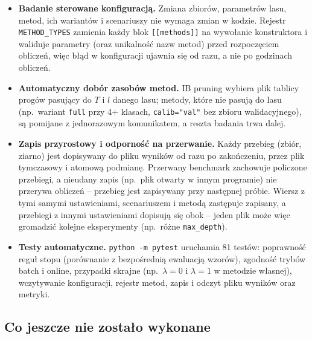 \documentclass{article}
\newcommand{\code}[1]{\texttt{#1}}
\begin{document}
\begin{itemize}[leftmargin=*]
  \item \textbf{Badanie sterowane konfiguracją.} Zmiana zbiorów, parametrów lasu, metod,
        ich wariantów i scenariuszy nie wymaga zmian w kodzie. Rejestr
        \code{METHOD\_TYPES} zamienia każdy blok \code{[[methods]]} na wywołanie
        konstruktora i waliduje parametry (oraz unikalność nazw metod) przed rozpoczęciem
        obliczeń, więc błąd w konfiguracji ujawnia się od razu, a nie po godzinach obliczeń.
  \item \textbf{Automatyczny dobór zasobów metod.} IB pruning wybiera plik tablicy progów
        pasujący do $T$ i $l$ danego lasu; metody, które nie pasują do lasu (np.\ wariant
        \code{full} przy 4+ klasach, \code{calib="val"} bez zbioru walidacyjnego), są
        pomijane z jednorazowym komunikatem, a reszta badania trwa dalej.
  \item \textbf{Zapis przyrostowy i odporność na przerwanie.} Każdy przebieg (zbiór,
        ziarno) jest dopisywany do pliku wyników od razu po zakończeniu, przez plik
        tymczasowy i atomową podmianę. Przerwany benchmark zachowuje policzone przebiegi,
        a nieudany zapis (np.\ plik otwarty w innym programie) nie przerywa obliczeń --
        przebieg jest zapisywany przy następnej próbie.
        Wiersz z tymi samymi ustawieniami, scenariuszem i metodą zastępuje zapisany, a
        przebiegi z innymi ustawieniami dopisują się obok -- jeden plik może więc
        gromadzić kolejne eksperymenty (np.\ różne \code{max\_depth}).
  \item \textbf{Testy automatyczne.} \code{python -m pytest} uruchamia 81 testów:
        poprawność reguł stopu (porównanie z bezpośrednią ewaluacją wzorów), zgodność
        trybów batch i online, przypadki skrajne (np.\ $\lambda = 0$ i $\lambda = 1$ w
        metodzie własnej), wczytywanie konfiguracji, rejestr metod, zapis i odczyt pliku
        wyników oraz metryki.
\end{itemize}

\subsection{Co jeszcze nie zostało wykonane}
\label{sec:todo}
\end{document}
